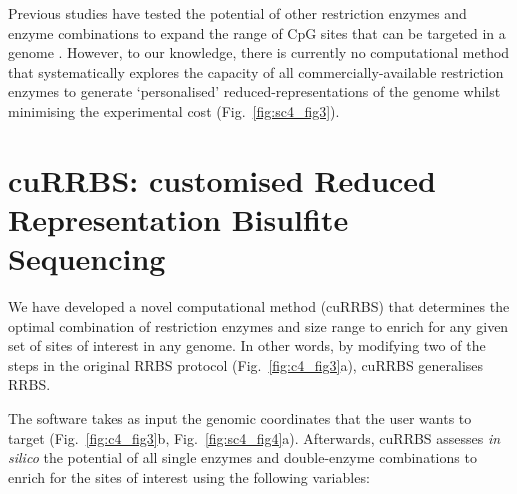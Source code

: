 \bigskip

Previous studies have tested the potential of other restriction enzymes and enzyme combinations to expand the range of CpG sites that can be targeted in a genome \cite{Cedar1979,Bystrykh2013,Martinez-Arguelles2014,Yu2004,Tanas2017,Lee2014,Wang2013,Kirschner2016}. However, to our knowledge, there is currently no computational method that systematically explores the capacity of all commercially-available restriction enzymes to generate `personalised' reduced-representations of the genome whilst minimising the experimental cost (Fig.~\ref{fig:sc4_fig3}).

\smallskip

\section{cuRRBS: customised Reduced Representation Bisulfite Sequencing}

\smallskip

We have developed a novel computational method (cuRRBS) that determines the optimal combination of restriction enzymes and size range to enrich for any given set of sites of interest in any genome. In other words, by modifying two of the steps in the original RRBS protocol (Fig.~\ref{fig:c4_fig3}a), cuRRBS generalises RRBS.

\bigskip

The software takes as input the genomic coordinates that the user wants to target (Fig.~\ref{fig:c4_fig3}b, Fig.~\ref{fig:sc4_fig4}a). Afterwards, cuRRBS assesses \textit{in silico} the potential of all single enzymes and double-enzyme combinations to enrich for the sites of interest using the following variables:

